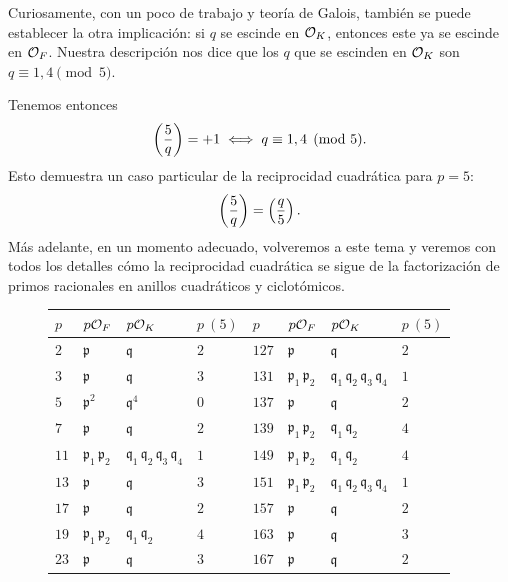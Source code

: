 \begin{ejemplo}
  Curiosamente, con un poco de trabajo y teoría de Galois, también se puede
  establecer la otra implicación: si $q$ se escinde en $\mathcal{O}_K$, entonces este ya
  se escinde en $\mathcal{O}_F$. Nuestra descripción nos dice que los $q$ que se escinden
  en $\mathcal{O}_K$ son $q \equiv 1,4 \pmod{5}$.

  Tenemos entonces
  $$\left(\frac{5}{q}\right) = +1 \iff q \equiv 1,4 \pmod{5}.$$
  Esto demuestra un caso particular de la reciprocidad cuadrática para $p = 5$:
  $$\left(\frac{5}{q}\right) = \left(\frac{q}{5}\right).$$
  Más adelante, en un momento adecuado, volveremos a este tema y veremos con
  todos los detalles cómo la reciprocidad cuadrática se sigue de la
  factorización de primos racionales en anillos cuadráticos y ciclotómicos.
\end{ejemplo}

\begin{figure}
  \begin{center}
    \renewcommand{\arraystretch}{1.5}
    \begin{tabular}{x{1cm}x{1.25cm}x{1.5cm}x{1cm}x{1cm}x{1.25cm}x{1.5cm}x{1cm}}
      $p$ & $p\mathcal{O}_F$ & $p\mathcal{O}_K$ & $p~(5)$ & $p$ & $p\mathcal{O}_F$ & $p\mathcal{O}_K$ & $p~(5)$ \tabularnewline
      \hline
      $2$ & $\mathfrak{p}$ & $\mathfrak{q}$ & $2$ & $127$ & $\mathfrak{p}$ & $\mathfrak{q}$ & $2$ \tabularnewline
      \hline
      $3$ & $\mathfrak{p}$ & $\mathfrak{q}$ & $3$ & $131$ & $\mathfrak{p}_1\,\mathfrak{p}_2$ & $\mathfrak{q}_1\,\mathfrak{q}_2\,\mathfrak{q}_3\,\mathfrak{q}_4$ & $1$ \tabularnewline
      \hline
      $5$ & $\mathfrak{p}^2$ & $\mathfrak{q}^4$ & $0$ & $137$ & $\mathfrak{p}$ & $\mathfrak{q}$ & $2$ \tabularnewline
      \hline
      $7$ & $\mathfrak{p}$ & $\mathfrak{q}$ & $2$ & $139$ & $\mathfrak{p}_1\,\mathfrak{p}_2$ & $\mathfrak{q}_1\,\mathfrak{q}_2$ & $4$ \tabularnewline
      \hline
      $11$ & $\mathfrak{p}_1\,\mathfrak{p}_2$ & $\mathfrak{q}_1\,\mathfrak{q}_2\,\mathfrak{q}_3\,\mathfrak{q}_4$ & $1$ & $149$ & $\mathfrak{p}_1\,\mathfrak{p}_2$ & $\mathfrak{q}_1\,\mathfrak{q}_2$ & $4$ \tabularnewline
      \hline
      $13$ & $\mathfrak{p}$ & $\mathfrak{q}$ & $3$ & $151$ & $\mathfrak{p}_1\,\mathfrak{p}_2$ & $\mathfrak{q}_1\,\mathfrak{q}_2\,\mathfrak{q}_3\,\mathfrak{q}_4$ & $1$ \tabularnewline
      \hline
      $17$ & $\mathfrak{p}$ & $\mathfrak{q}$ & $2$ & $157$ & $\mathfrak{p}$ & $\mathfrak{q}$ & $2$ \tabularnewline
      \hline
      $19$ & $\mathfrak{p}_1\,\mathfrak{p}_2$ & $\mathfrak{q}_1\,\mathfrak{q}_2$ & $4$ & $163$ & $\mathfrak{p}$ & $\mathfrak{q}$ & $3$ \tabularnewline
      \hline
      $23$ & $\mathfrak{p}$ & $\mathfrak{q}$ & $3$ & $167$ & $\mathfrak{p}$ & $\mathfrak{q}$ & $2$ \tabularnewline

\end{tabular}
\end{center}
\end{figure}
